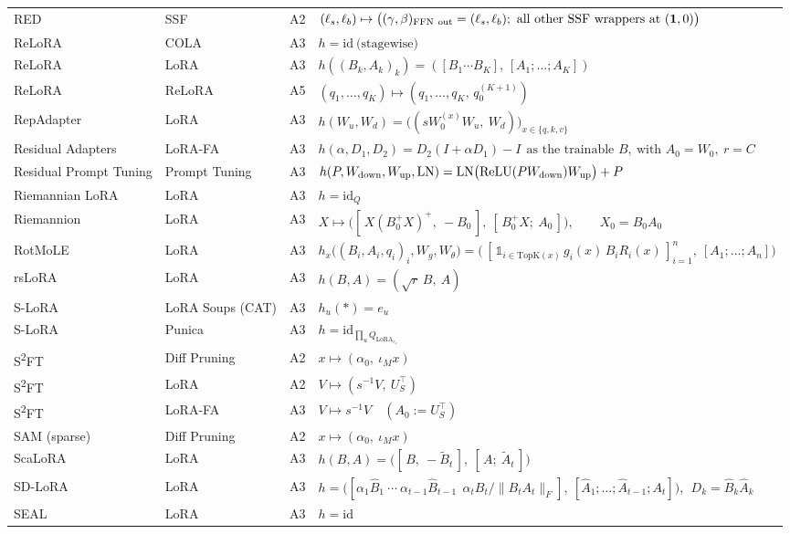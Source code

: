 \begin{longtable}{@{}>{\raggedright\arraybackslash}p{2.4cm}>{\raggedright\arraybackslash}p{2.4cm}c>{\raggedright\arraybackslash}p{8.6cm}@{}}
RED & SSF & A2 & $(\ell_s,\ell_b)\mapsto\big((\gamma,\beta)_{\rm FFN\ out}=(\ell_s,\ell_b);\ \text{all other SSF wrappers at }(\mathbf 1,0)\big)$\\
ReLoRA & COLA & A3 & $h=\mathrm{id}\ \text{(stagewise)}$\\
ReLoRA & LoRA & A3 & $h((B_k,A_k)_k)=([B_1\cdots B_K],\,[A_1;\dots;A_K])$\\
ReLoRA & ReLoRA & A5 & $(q_1,\dots,q_K)\mapsto(q_1,\dots,q_K,\,q_0^{(K+1)})$\\
RepAdapter & LoRA & A3 & $h(W_u,W_d)=\big((sW_0^{(x)}W_u,\ W_d)\big)_{x\in\{q,k,v\}}$\\
Residual Adapters & LoRA-FA & A3 & $h(\alpha,D_1,D_2)=D_2(I+\alpha D_1)-I\ \ \text{as the trainable }B,\ \text{with }A_0=W_0,\ r=C$\\
Residual Prompt Tuning & Prompt Tuning & A3 & $h(P,W_{\rm down},W_{\rm up},\mathrm{LN})=\mathrm{LN}\big(\mathrm{ReLU}(PW_{\rm down})W_{\rm up}\big)+P$\\
Riemannian LoRA & LoRA & A3 & $h=\mathrm{id}_Q$\\
Riemannion & LoRA & A3 & $X\mapsto\big([\,X(B_0^{+}X)^{+},\ -B_0\,],\ [\,B_0^{+}X;\ A_0\,]\big),\qquad X_0=B_0A_0$\\
RotMoLE & LoRA & A3 & $h_x\big((B_i,A_i,q_i)_i,W_g,W_\theta\big)=\big(\,[\,\mathbb 1_{i\in\mathrm{TopK}(x)}\,g_i(x)\,B_iR_i(x)\,]_{i=1}^{n},\ [A_1;\dots;A_n]\big)$\\
rsLoRA & LoRA & A3 & $h(B,A)=(\sqrt r\,B,\ A)$\\
S-LoRA & LoRA Soups (CAT) & A3 & $h_u(\ast)=e_u$\\
S-LoRA & Punica & A3 & $h=\mathrm{id}_{\prod_uQ_{\mathrm{LoRA}_{r_u}}}$\\
S\textsuperscript{2}FT & Diff Pruning & A2 & $x\mapsto(\alpha_0,\ \iota_M x)$\\
S\textsuperscript{2}FT & LoRA & A2 & $V\mapsto(s^{-1}V,\ U_S^\top)$\\
S\textsuperscript{2}FT & LoRA-FA & A3 & $V\mapsto s^{-1}V\quad(A_0:=U_S^\top)$\\
SAM (sparse) & Diff Pruning & A2 & $x\mapsto(\alpha_0,\ \iota_M x)$\\
ScaLoRA & LoRA & A3 & $h(B,A)=\big([\,B,\ -\widetilde B_t\,],\ [\,A;\ \widetilde A_t\,]\big)$\\
SD-LoRA & LoRA & A3 & $h=\big([\alpha_1\hat B_1\ \cdots\ \alpha_{t-1}\hat B_{t-1}\ \ \alpha_tB_t/\lVert B_tA_t\rVert_F],\ [\hat A_1;\dots;\hat A_{t-1};A_t]\big),\ \ D_k=\hat B_k\hat A_k$\\
SEAL & LoRA & A3 & $h=\mathrm{id}$\\

\end{longtable}
